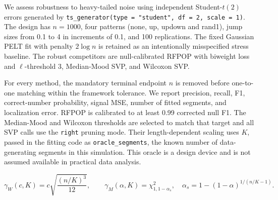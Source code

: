 \documentclass[11pt]{article}
\begin{document}
We assess robustness to heavy-tailed noise using independent Student-$t(2)$
errors generated by \texttt{ts\_generator(type = "student", df = 2, scale = 1)}.
The design has $n=1000$, four patterns (none, up, updown and rand1), jump sizes
from 0.1 to 4 in increments of 0.1, and 100 replications. The fixed Gaussian
PELT fit with penalty $2\log n$ is retained as an intentionally misspecified
stress baseline. The robust competitors are null-calibrated RFPOP with
biweight loss and $\ell$-threshold 3, Median-Mood SVP, and Wilcoxon SVP.

For every method, the mandatory terminal endpoint $n$ is removed before
one-to-one matching within the framework tolerance. We report precision,
recall, F1, correct-number probability, signal MSE, number of fitted segments,
and localization error. RFPOP is calibrated to at least 0.99 corrected null F1.
The Median-Mood and Wilcoxon thresholds are selected to match that target and
all SVP calls use the \texttt{right} pruning mode. Their length-dependent
scaling uses $K$, passed in the fitting code as \texttt{oracle\_segments}, the
known number of data-generating segments in this simulation. This oracle is a
design device and is not assumed available in practical data analysis.

\[
 \gamma_W(c,K)=c\sqrt{\frac{(n/K)^3}{12}},\qquad
 \gamma_M(\alpha,K)=\chi^2_{1,1-\alpha_s},\quad
 \alpha_s=1-(1-\alpha)^{1/(n/K-1)}.
\]
\end{document}
